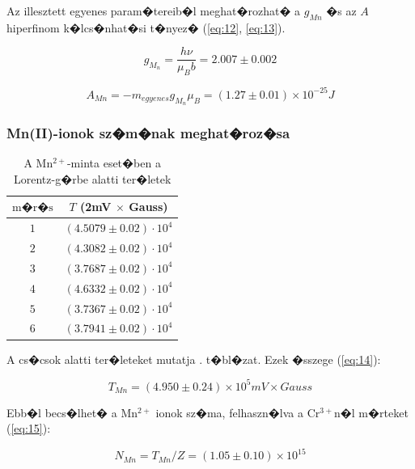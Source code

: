 \documentclass[a4paper,12pt]{article}
\begin{document}
Az illesztett egyenes param�tereib�l meghat�rozhat� a $g_{Mn}$ �s az $A$ hiperfinom k�lcs�nhat�si t�nyez� (\ref{eq:12}, \ref{eq:13}).

\begin{equation}
g_{M_n}= \dfrac{h \nu}{\mu_{B} b}= 2.007 \pm 0.002
\label{eq:12}
\end{equation}

\begin{equation}
A_{Mn}=-m_{egyenes}g_{M_n} \mu_{B} = (1.27 \pm 0.01) \times10^{-25} J
\label{eq:13}
\end{equation}




\subsubsection{Mn(II)-ionok sz�m�nak meghat�roz�sa}


\begin{table}[H]
\begin{center}
\begin{tabular}{|c|c|}
 \hline
$\textrm{m�r�s}$ & $T$ (2mV $\times$ Gauss) \\ \hline
$1$ & $(4.5079 \pm 0.02) \cdot 10^4$ \\ \hline
$2$ & $(4.3082 \pm 0.02) \cdot 10^4$ \\ \hline
$3$ & $(3.7687 \pm 0.02) \cdot 10^4$ \\ \hline
$4$ & $(4.6332 \pm 0.02) \cdot 10^4$ \\ \hline
$5$ & $(3.7367 \pm 0.02) \cdot 10^4$ \\ \hline
$6$ & $(3.7941 \pm 0.02) \cdot 10^4$ \\ \hline
\end{tabular}
\caption{A Mn$^{2+}$-minta eset�ben a Lorentz-g�rbe alatti ter�letek}
\label{tab:3}
\end{center}
\end{table}
A cs�csok alatti ter�leteket mutatja . t�bl�zat. Ezek �sszege (\ref{eq:14}):

\begin{equation}
T_{Mn}=(4.950\pm0.24)\times10^{5} mV \times Gauss
\label{eq:14}
\end{equation}

Ebb�l becs�lhet� a Mn$^{2+}$ ionok sz�ma, felhaszn�lva a Cr$^{3+}$n�l m�rteket (\ref{eq:15}):

\begin{equation}
N_{Mn}=T_{Mn}/Z=(1.05\pm 0.10)\times 10^{15}
\label{eq:15}
\end{equation}
\end{document}
